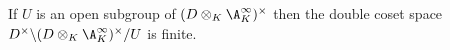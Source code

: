\begin{theorem}
  \label{NumberField.FiniteAdeleRing.DivisionAlgebra.finiteDoubleCoset}
  \leanok
  If $U$ is an open subgroup of $(D\otimes_K \A_K^\infty)^\times$
  then the double coset space $D^\times\backslash(D\otimes_K \A_K^\infty)^\times/U$ is finite.
\end{theorem}
